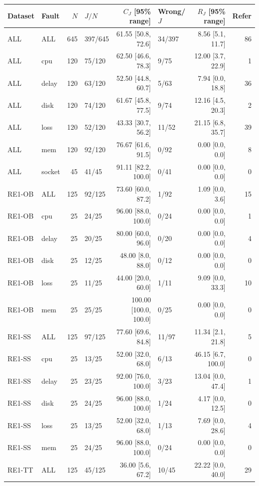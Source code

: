 \begin{tabular*}{\linewidth}{@{\extracolsep{\fill}}llrlrlrr@{}}
\toprule
Dataset & Fault & $N$ & $J/N$ & $C_J$ [95\% range] & Wrong/$J$ & $R_J$ [95\% range] & Refer \\
\midrule
ALL & ALL & 645 & 397/645 & 61.55 [50.8, 72.6] & 34/397 & 8.56 [5.1, 11.7] & 86 \\
ALL & cpu & 120 & 75/120 & 62.50 [46.6, 78.3] & 9/75 & 12.00 [3.7, 22.9] & 1 \\
ALL & delay & 120 & 63/120 & 52.50 [44.8, 60.7] & 5/63 & 7.94 [0.0, 18.8] & 36 \\
ALL & disk & 120 & 74/120 & 61.67 [45.8, 77.5] & 9/74 & 12.16 [4.5, 20.3] & 2 \\
ALL & loss & 120 & 52/120 & 43.33 [30.7, 56.2] & 11/52 & 21.15 [6.8, 35.7] & 39 \\
ALL & mem & 120 & 92/120 & 76.67 [61.6, 91.5] & 0/92 & 0.00 [0.0, 0.0] & 8 \\
ALL & socket & 45 & 41/45 & 91.11 [82.2, 100.0] & 0/41 & 0.00 [0.0, 0.0] & 0 \\
RE1-OB & ALL & 125 & 92/125 & 73.60 [60.0, 87.2] & 1/92 & 1.09 [0.0, 3.6] & 15 \\
RE1-OB & cpu & 25 & 24/25 & 96.00 [88.0, 100.0] & 0/24 & 0.00 [0.0, 0.0] & 1 \\
RE1-OB & delay & 25 & 20/25 & 80.00 [60.0, 96.0] & 0/20 & 0.00 [0.0, 0.0] & 4 \\
RE1-OB & disk & 25 & 12/25 & 48.00 [8.0, 88.0] & 0/12 & 0.00 [0.0, 0.0] & 0 \\
RE1-OB & loss & 25 & 11/25 & 44.00 [20.0, 60.0] & 1/11 & 9.09 [0.0, 33.3] & 10 \\
RE1-OB & mem & 25 & 25/25 & 100.00 [100.0, 100.0] & 0/25 & 0.00 [0.0, 0.0] & 0 \\
RE1-SS & ALL & 125 & 97/125 & 77.60 [69.6, 84.8] & 11/97 & 11.34 [2.1, 21.8] & 5 \\
RE1-SS & cpu & 25 & 13/25 & 52.00 [32.0, 68.0] & 6/13 & 46.15 [6.7, 100.0] & 0 \\
RE1-SS & delay & 25 & 23/25 & 92.00 [76.0, 100.0] & 3/23 & 13.04 [0.0, 47.4] & 1 \\
RE1-SS & disk & 25 & 24/25 & 96.00 [88.0, 100.0] & 1/24 & 4.17 [0.0, 12.5] & 0 \\
RE1-SS & loss & 25 & 13/25 & 52.00 [32.0, 68.0] & 1/13 & 7.69 [0.0, 28.6] & 4 \\
RE1-SS & mem & 25 & 24/25 & 96.00 [88.0, 100.0] & 0/24 & 0.00 [0.0, 0.0] & 0 \\
RE1-TT & ALL & 125 & 45/125 & 36.00 [5.6, 67.2] & 10/45 & 22.22 [0.0, 40.0] & 29 \\

\end{tabular*}
